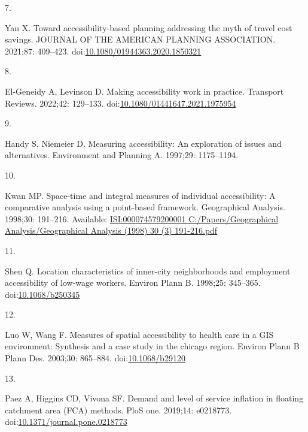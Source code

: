 \documentclass[10pt,letterpaper]{article}
\newlength{\cslhangindent}
\newlength{\csllabelwidth}
\newlength{\cslentryspacingunit} %
\newenvironment{CSLReferences}[2] %
 {%
  \setlength{\parindent}{0pt}
  \ifodd #1
  \let\oldpar\par
  \def\par{\hangindent=\cslhangindent\oldpar}
  \fi
  \setlength{\parskip}{#2\cslentryspacingunit}
 }%
 {}
\newcommand{\CSLLeftMargin}[1]{\parbox[t]{\csllabelwidth}{#1}}
\newcommand{\CSLRightInline}[1]{\parbox[t]{\linewidth - \csllabelwidth}{#1}\break}
\begin{document}
\begin{CSLReferences}{0}{0}
\leavevmode{}%
\CSLLeftMargin{7. }%
\CSLRightInline{Yan X. Toward accessibility-based planning addressing
the myth of travel cost savings. {JOURNAL} {OF} {THE} {AMERICAN}
{PLANNING} {ASSOCIATION}. 2021;87: 409--423.
doi:\href{https://doi.org/10.1080/01944363.2020.1850321}{10.1080/01944363.2020.1850321}}

\leavevmode{}%
\CSLLeftMargin{8. }%
\CSLRightInline{El-Geneidy A, Levinson D. Making accessibility work in
practice. Transport Reviews. 2022;42: 129--133.
doi:\href{https://doi.org/10.1080/01441647.2021.1975954}{10.1080/01441647.2021.1975954}}

\leavevmode{}%
\CSLLeftMargin{9. }%
\CSLRightInline{Handy S, Niemeier D. Measuring accessibility: An
exploration of issues and alternatives. Environment and Planning A.
1997;29: 1175--1194. }

\leavevmode{}%
\CSLLeftMargin{10. }%
\CSLRightInline{Kwan MP. Space-time and integral measures of individual
accessibility: A comparative analysis using a point-based framework.
Geographical Analysis. 1998;30: 191--216. Available:
\href{https://ISI:000074579200001\%0AC:/Papers/Geographical\%20Analysis/Geographical\%20Analysis\%20(1998)\%2030\%20(3)\%20191-216.pdf}{ISI:000074579200001
C:/Papers/Geographical Analysis/Geographical Analysis (1998) 30 (3)
191-216.pdf}}

\leavevmode{}%
\CSLLeftMargin{11. }%
\CSLRightInline{Shen Q. Location characteristics of inner-city
neighborhoods and employment accessibility of low-wage workers. Environ
Plann B. 1998;25: 345--365.
doi:\href{https://doi.org/10.1068/b250345}{10.1068/b250345}}

\leavevmode{}%
\CSLLeftMargin{12. }%
\CSLRightInline{Luo W, Wang F. Measures of spatial accessibility to
health care in a {GIS} environment: Synthesis and a case study in the
chicago region. Environ Plann B Plann Des. 2003;30: 865--884.
doi:\href{https://doi.org/10.1068/b29120}{10.1068/b29120}}

\leavevmode{}%
\CSLLeftMargin{13. }%
\CSLRightInline{Paez A, Higgins CD, Vivona SF. Demand and level of
service inflation in floating catchment area (FCA) methods. PloS one.
2019;14: e0218773.
doi:\href{https://doi.org/10.1371/journal.pone.0218773}{10.1371/journal.pone.0218773}}


\end{CSLReferences}
\end{document}
